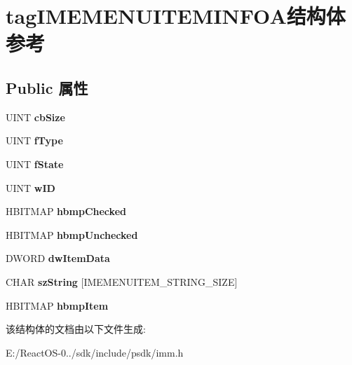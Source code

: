 \hypertarget{structtag_i_m_e_m_e_n_u_i_t_e_m_i_n_f_o_a}{}\section{tag\+I\+M\+E\+M\+E\+N\+U\+I\+T\+E\+M\+I\+N\+F\+O\+A结构体 参考}
\label{structtag_i_m_e_m_e_n_u_i_t_e_m_i_n_f_o_a}
\subsection*{Public 属性}
\begin{DoxyCompactItemize}
\item 
\mbox{\label{structtag_i_m_e_m_e_n_u_i_t_e_m_i_n_f_o_a_afb1e09d749b56c17c95a6ad4e12444ab}} 
U\+I\+NT {\bfseries cb\+Size}
\item 
\mbox{\label{structtag_i_m_e_m_e_n_u_i_t_e_m_i_n_f_o_a_a38324037df966994e66c814d16fb5c5d}} 
U\+I\+NT {\bfseries f\+Type}
\item 
\mbox{\label{structtag_i_m_e_m_e_n_u_i_t_e_m_i_n_f_o_a_ad6665a18ab7ee84d47a6708a2a56ae98}} 
U\+I\+NT {\bfseries f\+State}
\item 
\mbox{\label{structtag_i_m_e_m_e_n_u_i_t_e_m_i_n_f_o_a_a00c07dbd2b78f8c68ab6ea826875acfc}} 
U\+I\+NT {\bfseries w\+ID}
\item 
\mbox{\label{structtag_i_m_e_m_e_n_u_i_t_e_m_i_n_f_o_a_a740239c3e486bbc9f9ac48663f4096b8}} 
H\+B\+I\+T\+M\+AP {\bfseries hbmp\+Checked}
\item 
\mbox{\label{structtag_i_m_e_m_e_n_u_i_t_e_m_i_n_f_o_a_a2245895de0cdae569864726a436f9db5}} 
H\+B\+I\+T\+M\+AP {\bfseries hbmp\+Unchecked}
\item 
\mbox{\label{structtag_i_m_e_m_e_n_u_i_t_e_m_i_n_f_o_a_a93df870491ff54ddef3af5d18b4e9053}} 
D\+W\+O\+RD {\bfseries dw\+Item\+Data}
\item 
\mbox{\label{structtag_i_m_e_m_e_n_u_i_t_e_m_i_n_f_o_a_a949a3e653d07fa213a6a5e653fafba05}} 
C\+H\+AR {\bfseries sz\+String} \mbox{[}I\+M\+E\+M\+E\+N\+U\+I\+T\+E\+M\+\_\+\+S\+T\+R\+I\+N\+G\+\_\+\+S\+I\+ZE\mbox{]}
\item 
\mbox{\label{structtag_i_m_e_m_e_n_u_i_t_e_m_i_n_f_o_a_ad2d5fc590486b1a569be656d580fa9f0}} 
H\+B\+I\+T\+M\+AP {\bfseries hbmp\+Item}
\end{DoxyCompactItemize}


该结构体的文档由以下文件生成\+:\begin{DoxyCompactItemize}
\item 
E\+:/\+React\+O\+S-\/0../sdk/include/psdk/imm.\+h\end{DoxyCompactItemize}
